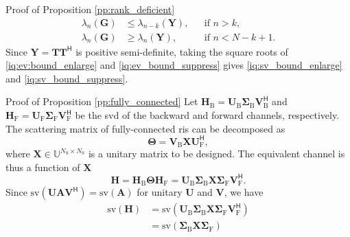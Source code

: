 \documentclass[journal]{IEEEtran}
\begin{document}
\begin{appendix}
\begin{subsection}{Proof of Proposition \ref{pp:rank_deficient}}
		\begin{align}
			\lambda_n(\mathbf{G}) & \le \lambda_{n-k}(\mathbf{Y}), &  & \text{if } n > k, \label{iq:ev:bound_enlarge}          \\
			\lambda_n(\mathbf{G}) & \ge \lambda_n(\mathbf{Y}),     &  & \text{if } n < N - k + 1 \label{iq:ev_bound_suppress}.
		\end{align}
		Since $\mathbf{Y} = \mathbf{T} \mathbf{T}^\mathsf{H}$ is positive semi-definite, taking the square roots of \eqref{iq:ev:bound_enlarge} and \eqref{iq:ev_bound_suppress} gives \eqref{iq:sv_bound_enlarge} and \eqref{iq:sv_bound_suppress}.
	\end{subsection}

	\begin{subsection}{Proof of Proposition \ref{pp:fully_connected}}\label{ap:fully_connected}
		Let $\mathbf{H}_\mathrm{B} = \mathbf{U}_\mathrm{B} \mathbf{\Sigma}_\mathrm{B} \mathbf{V}_\mathrm{B}^\mathsf{H}$ and $\mathbf{H}_\mathrm{F} = \mathbf{U}_\mathrm{F} \mathbf{\Sigma}_\mathrm{F} \mathbf{V}_\mathrm{F}^\mathsf{H}$ be the \gls{svd} of the backward and forward channels, respectively.
		The scattering matrix of fully-connected \gls{ris} can be decomposed as
		\begin{equation}
			\mathbf{\Theta} = \mathbf{V}_\mathrm{B} \mathbf{X} \mathbf{U}_\mathrm{F}^\mathsf{H},
			\label{eq:scattering_fc}
		\end{equation}
		where $\mathbf{X} \in \mathbb{U}^{N_\mathrm{S} \times N_\mathrm{S}}$ is a unitary matrix to be designed.
		The equivalent channel is thus a function of $\mathbf{X}$
		\begin{equation}
			\mathbf{H} = \mathbf{H}_\mathrm{B} \mathbf{\Theta} \mathbf{H}_\mathrm{F} = \mathbf{U}_\mathrm{B} \mathbf{\Sigma}_\mathrm{B} \mathbf{X} \mathbf{\Sigma}_\mathrm{F} \mathbf{V}_\mathrm{F}^\mathsf{H}.
			\label{eq:channel_equivalent_fc}
		\end{equation}
		Since $\mathrm{sv}(\mathbf{U} \mathbf{A} \mathbf{V}^\mathsf{H}) = \mathrm{sv}(\mathbf{A})$ for unitary $\mathbf{U}$ and $\mathbf{V}$, we have
		\begin{align*}
			\mathrm{sv}(\mathbf{H}) & = \mathrm{sv}(\mathbf{U}_\mathrm{B} \mathbf{\Sigma}_\mathrm{B} \mathbf{X} \mathbf{\Sigma}_\mathrm{F} \mathbf{V}_\mathrm{F}^\mathsf{H})                                                                     \\
			                        & = \mathrm{sv}(\mathbf{\Sigma}_\mathrm{B} \mathbf{X} \mathbf{\Sigma}_\mathrm{F})                                                                                                                            \\

\end{align*}
\end{subsection}
\end{appendix}
\end{document}
